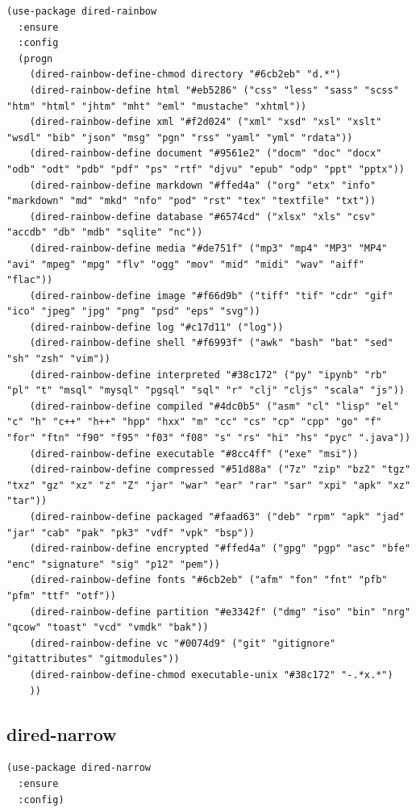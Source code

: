 \documentclass[11pt]{article}
\begin{document}
\begin{verbatim}
(use-package dired-rainbow
  :ensure
  :config
  (progn
    (dired-rainbow-define-chmod directory "#6cb2eb" "d.*")
    (dired-rainbow-define html "#eb5286" ("css" "less" "sass" "scss" "htm" "html" "jhtm" "mht" "eml" "mustache" "xhtml"))
    (dired-rainbow-define xml "#f2d024" ("xml" "xsd" "xsl" "xslt" "wsdl" "bib" "json" "msg" "pgn" "rss" "yaml" "yml" "rdata"))
    (dired-rainbow-define document "#9561e2" ("docm" "doc" "docx" "odb" "odt" "pdb" "pdf" "ps" "rtf" "djvu" "epub" "odp" "ppt" "pptx"))
    (dired-rainbow-define markdown "#ffed4a" ("org" "etx" "info" "markdown" "md" "mkd" "nfo" "pod" "rst" "tex" "textfile" "txt"))
    (dired-rainbow-define database "#6574cd" ("xlsx" "xls" "csv" "accdb" "db" "mdb" "sqlite" "nc"))
    (dired-rainbow-define media "#de751f" ("mp3" "mp4" "MP3" "MP4" "avi" "mpeg" "mpg" "flv" "ogg" "mov" "mid" "midi" "wav" "aiff" "flac"))
    (dired-rainbow-define image "#f66d9b" ("tiff" "tif" "cdr" "gif" "ico" "jpeg" "jpg" "png" "psd" "eps" "svg"))
    (dired-rainbow-define log "#c17d11" ("log"))
    (dired-rainbow-define shell "#f6993f" ("awk" "bash" "bat" "sed" "sh" "zsh" "vim"))
    (dired-rainbow-define interpreted "#38c172" ("py" "ipynb" "rb" "pl" "t" "msql" "mysql" "pgsql" "sql" "r" "clj" "cljs" "scala" "js"))
    (dired-rainbow-define compiled "#4dc0b5" ("asm" "cl" "lisp" "el" "c" "h" "c++" "h++" "hpp" "hxx" "m" "cc" "cs" "cp" "cpp" "go" "f" "for" "ftn" "f90" "f95" "f03" "f08" "s" "rs" "hi" "hs" "pyc" ".java"))
    (dired-rainbow-define executable "#8cc4ff" ("exe" "msi"))
    (dired-rainbow-define compressed "#51d88a" ("7z" "zip" "bz2" "tgz" "txz" "gz" "xz" "z" "Z" "jar" "war" "ear" "rar" "sar" "xpi" "apk" "xz" "tar"))
    (dired-rainbow-define packaged "#faad63" ("deb" "rpm" "apk" "jad" "jar" "cab" "pak" "pk3" "vdf" "vpk" "bsp"))
    (dired-rainbow-define encrypted "#ffed4a" ("gpg" "pgp" "asc" "bfe" "enc" "signature" "sig" "p12" "pem"))
    (dired-rainbow-define fonts "#6cb2eb" ("afm" "fon" "fnt" "pfb" "pfm" "ttf" "otf"))
    (dired-rainbow-define partition "#e3342f" ("dmg" "iso" "bin" "nrg" "qcow" "toast" "vcd" "vmdk" "bak"))
    (dired-rainbow-define vc "#0074d9" ("git" "gitignore" "gitattributes" "gitmodules"))
    (dired-rainbow-define-chmod executable-unix "#38c172" "-.*x.*")
    ))

\end{verbatim}
\subsection{dired-narrow}
\label{sec:org64f681a}
\begin{verbatim}
(use-package dired-narrow
  :ensure
  :config)
\end{verbatim}
\end{document}
